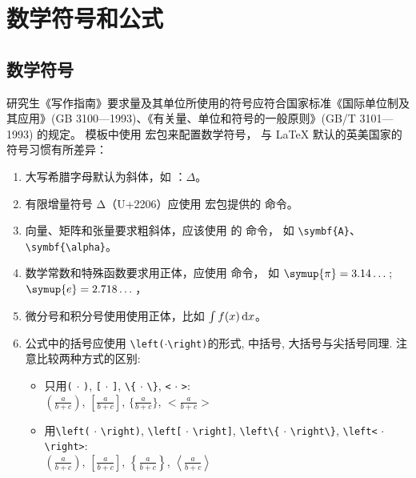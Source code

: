 
\chapter{数学符号和公式}

\section{数学符号}

研究生《写作指南》要求量及其单位所使用的符号应符合国家标准《国际单位制及其应用》(GB 3100—1993)、《有关量、单位和符号的一般原则》(GB/T 3101—1993) 的规定。
模板中使用  宏包来配置数学符号，
与 \LaTeX{} 默认的英美国家的符号习惯有所差异：
\begin{enumerate}
  \item 大写希腊字母默认为斜体，如 ：$\Delta$。
  \item 有限增量符号 $\increment$（U+2206）应使用  宏包提供的
     命令。
  \item 向量、矩阵和张量要求粗斜体，应该使用  的  命令，
    如 \verb|\symbf{A}|、\verb|\symbf{\alpha}|。
  \item 数学常数和特殊函数要求用正体，应使用  命令，
    如 $\symup{\pi} = 3.14\dots$; $\symup{e} = 2.718\dots$，
  \item 微分号和积分号使用使用正体，比如 $\int f(x) \mathop{}\!\mathrm{d} x$。
  \item 公式中的括号应使用 \verb|\left(|$\cdot$\verb|\right)|的形式, 中括号, 大括号与尖括号同理.
      注意比较两种方式的区别:
      \begin{itemize}
          \item 只用\verb|(| $\cdot$ \verb|)|, \verb|[| $\cdot$ \verb|]|, \verb|\{| $\cdot$ \verb|\}|, \verb|<| $\cdot$ \verb|>|: \\
              $\displaystyle (\frac{a}{b + c})$, $\displaystyle [\frac{a}{b + c}]$, $\displaystyle \{\frac{a}{b + c}\}$, $\displaystyle <\frac{a}{b + c}>$
          \item 用\verb|\left(| $\cdot$ \verb|\right)|, \verb|\left[| $\cdot$ \verb|\right]|, \verb|\left\{| $\cdot$ \verb|\right\}|, \verb|\left<| $\cdot$ \verb|\right>|: \\
              $\displaystyle \left(\frac{a}{b + c}\right)$, $\displaystyle \left[\frac{a}{b + c}\right]$, $\displaystyle \left\{\frac{a}{b + c}\right\}$, $\displaystyle \left<\frac{a}{b + c}\right>$
      \end{itemize}
\end{enumerate}
\vspace{0.2cm}

